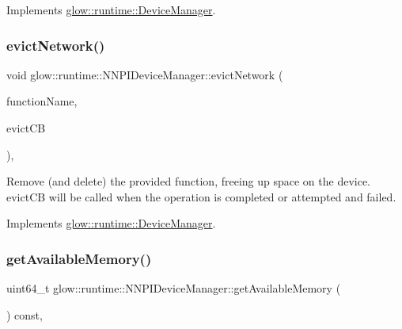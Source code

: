 Implements \hyperlink{classglow_1_1runtime_1_1_device_manager_a9bbf9a88f8bf9ddc0ce63590580aa91f}{glow\+::runtime\+::\+Device\+Manager}.

\mbox{\label{classglow_1_1runtime_1_1_n_n_p_i_device_manager_ae8afcfbbd9badbdd13dacc08d813ec2d}} 
\subsubsection{\texorpdfstring{evict\+Network()}{evictNetwork()}}
{\footnotesize\ttfamily void glow\+::runtime\+::\+N\+N\+P\+I\+Device\+Manager\+::evict\+Network (\begin{DoxyParamCaption}\item[{std\+::string}]{function\+Name,  }\item[{Evict\+Function\+C\+B\+Ty}]{evict\+CB }\end{DoxyParamCaption})\hspace{0.3cm}{\ttfamily [override]}, {\ttfamily [virtual]}}

Remove (and delete) the provided function, freeing up space on the device. {\ttfamily evict\+CB} will be called when the operation is completed or attempted and failed. 

Implements \hyperlink{classglow_1_1runtime_1_1_device_manager_a147c76a007db17659c1962c1fa864f9a}{glow\+::runtime\+::\+Device\+Manager}.

\mbox{\label{classglow_1_1runtime_1_1_n_n_p_i_device_manager_ab494e0ba08e0859f436ef591c15f7fd5}} 
\subsubsection{\texorpdfstring{get\+Available\+Memory()}{getAvailableMemory()}}
{\footnotesize\ttfamily uint64\+\_\+t glow\+::runtime\+::\+N\+N\+P\+I\+Device\+Manager\+::get\+Available\+Memory (\begin{DoxyParamCaption}{ }\end{DoxyParamCaption}) const\hspace{0.3cm}{\ttfamily [override]}, {\ttfamily [virtual]}}

